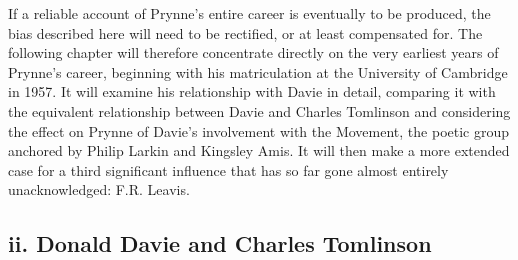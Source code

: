 \documentclass[]{article}
\begin{document}
If a reliable account of Prynne's entire career is eventually to be
produced, the bias described here will need to be rectified, or at least
compensated for. The following chapter will therefore concentrate
directly on the very earliest years of Prynne's career, beginning with
his matriculation at the University of Cambridge in 1957. It will
examine his relationship with Davie in detail, comparing it with the
equivalent relationship between Davie and Charles Tomlinson and
considering the effect on Prynne of Davie's involvement with the
Movement, the poetic group anchored by Philip Larkin and Kingsley Amis.
It will then make a more extended case for a third significant influence
that has so far gone almost entirely unacknowledged: F.R. Leavis.

\subsection{ii. Donald Davie and Charles
Tomlinson}\label{ii.-donald-davie-and-charles-tomlinson}
\end{document}
